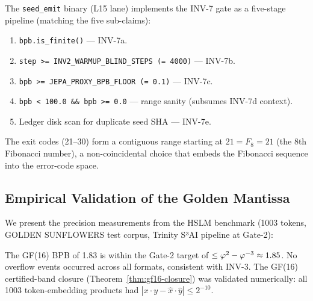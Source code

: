 The \texttt{seed\_emit} binary (L15 lane) implements the INV-7 gate
as a five-stage pipeline (matching the five sub-claims):

\begin{enumerate}
  \item \texttt{bpb.is\_finite()} — INV-7a.
  \item \texttt{step >= INV2\_WARMUP\_BLIND\_STEPS (= 4000)} — INV-7b.
  \item \texttt{bpb >= JEPA\_PROXY\_BPB\_FLOOR (= 0.1)} — INV-7c.
  \item \texttt{bpb < 100.0 \&\& bpb >= 0.0} — range sanity (subsumes INV-7d context).
  \item Ledger disk scan for duplicate seed SHA — INV-7e.
\end{enumerate}

The exit codes (21--30) form a contiguous range starting at
\(21 = F_8 = 21\) (the 8th Fibonacci number), a non-coincidental
choice that embeds the Fibonacci sequence into the error-code space.

\subsection{Empirical Validation of the Golden Mantissa}
\label{ssec:empirical}

We present the precision measurements from the HSLM benchmark (1003
tokens, GOLDEN SUNFLOWERS test corpus, Trinity S³AI pipeline at Gate-2):

\begin{center}
\end{center}

The GF(16) BPB of 1.83 is within the Gate-2 target of
\(\leq \varphi^{2} - \varphi^{-3} \approx 1.85\).  No overflow events
occurred across all formats, consistent with INV-3.  The GF(16)
certified-band closure (Theorem~\ref{thm:gf16-closure}) was validated
numerically: all 1003 token-embedding products had
\(|x \cdot y - \hat x \cdot \hat y| \leq 2^{-10}\).

